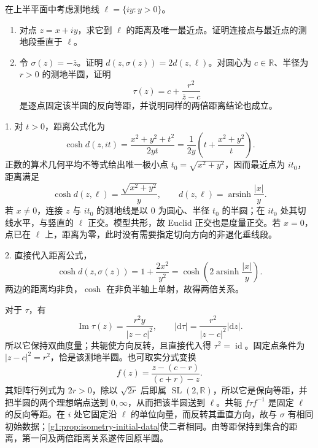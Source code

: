 \begin{exercise}
	\label{g1:ex:hyperbolic-reflection-distance}
	在上半平面中考虑测地线 \(\ell=\{iy:y>0\}\)。
	\begin{enumerate}
		\item 对点 \(z=x+iy\)，求它到 \(\ell\) 的距离及唯一最近点。证明连接点与最近点的测地段垂直于 \(\ell\)。
		\item 令 \(\sigma(z)=-\overline z\)。证明 \(d(z,\sigma(z))=2d(z,\ell)\)。对圆心为 \(c\in\mathbb R\)、半径为 \(r>0\) 的测地半圆，证明
		\[
			\tau(z)=c+\frac{r^2}{\overline z-c}
		\]
		是逐点固定该半圆的反向等距，并说明同样的两倍距离结论也成立。
	\end{enumerate}
\end{exercise}
\begin{solution}
	1. 对 \(t>0\)，距离公式化为
	\[
		\cosh d(z,it)=\frac{x^2+y^2+t^2}{2yt}
		=\frac1{2y}\left(t+\frac{x^2+y^2}{t}\right).
	\]
	正数的算术几何平均不等式给出唯一极小点 \(t_0=\sqrt{x^2+y^2}\)，因而最近点为 \(it_0\)，距离满足
	\[
		\cosh d(z,\ell)=\frac{\sqrt{x^2+y^2}}y,
		\qquad d(z,\ell)=\operatorname{arsinh}\frac{|x|}y.
	\]
	若 \(x\ne0\)，连接 \(z\) 与 \(it_0\) 的测地线是以 \(0\) 为圆心、半径 \(t_0\) 的半圆；在 \(it_0\) 处其切线水平，与竖直的 \(\ell\) 正交。模型共形，故 Euclid 正交也是度量正交。若 \(x=0\)，点已在 \(\ell\) 上，距离为零，此时没有需要指定切向方向的非退化垂线段。

	2. 直接代入距离公式，
	\[
		\cosh d(z,\sigma(z))=1+\frac{2x^2}{y^2}
		=\cosh\left(2\operatorname{arsinh}\frac{|x|}y\right).
	\]
	两边的距离均非负，\(\cosh\) 在非负半轴上单射，故得两倍关系。

	对于 \(\tau\)，有
	\[
		\operatorname{Im}\tau(z)=\frac{r^2y}{|z-c|^2},\qquad
		|\mathrm{d}\tau|=\frac{r^2}{|z-c|^2}|\mathrm{d}z|.
	\]
	所以它保持双曲度量；共轭使方向反转，且直接代入得 \(\tau^2=\operatorname{id}\)。固定点条件为 \(|z-c|^2=r^2\)，恰是该测地半圆。也可取实分式变换
	\[
		f(z)=\frac{z-(c-r)}{(c+r)-z}.
	\]
	其矩阵行列式为 \(2r>0\)，除以 \(\sqrt{2r}\) 后即属 \(\operatorname{SL}(2,\mathbb R)\)，所以它是保向等距，并把半圆的两个理想端点送到 \(0,\infty\)，从而把该半圆送到 \(\ell\)。共轭 \(f\tau f^{-1}\) 是固定 \(\ell\) 的反向等距。在 \(i\) 处它固定沿 \(\ell\) 的单位向量，而反转其垂直方向，故与 \(\sigma\) 有相同初始数据；\cref{g1:prop:isometry-initial-data}使二者相同。由等距保持到集合的距离，第一问及两倍距离关系遂传回原半圆。
\end{solution}

